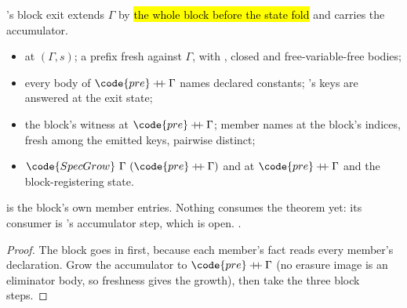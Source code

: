 \begin{theorem}
\label{thm:regInv_recConst_step}
\leanok
{}
 's block exit extends $\Gamma$ by \hl{the whole block before the state
fold} and carries the accumulator.
\begin{itemize}
\item {}  at $(\Gamma, s)$; a prefix  fresh against $\Gamma$, with
, closed and free-variable-free bodies;
\item every body of $\code{pre} \mathbin{+\!\!+} \Gamma$ names declared constants; 's keys are
answered at the exit state;
\item the block's  witness at $\code{pre} \mathbin{+\!\!+} \Gamma$; member names at the
block's indices, fresh among the emitted keys, pairwise distinct;
\item {} $\code{SpecGrow}\ \Gamma\ (\code{pre} \mathbin{+\!\!+} \Gamma)$ and  at
$\code{pre} \mathbin{+\!\!+} \Gamma$ and the block-registering state.
\end{itemize}
  is the block's own member entries. Nothing consumes the theorem yet: its consumer
is 's accumulator step, which is open.
 \stProved{}.
\end{theorem}
\begin{proof}
\leanok
{}
 The block goes in first, because each member's \Lower{} fact reads every member's
declaration. Grow the accumulator to $\code{pre} \mathbin{+\!\!+} \Gamma$ (no erasure image is an
eliminator body, so freshness gives the growth), then take the three block steps.
\end{proof}
